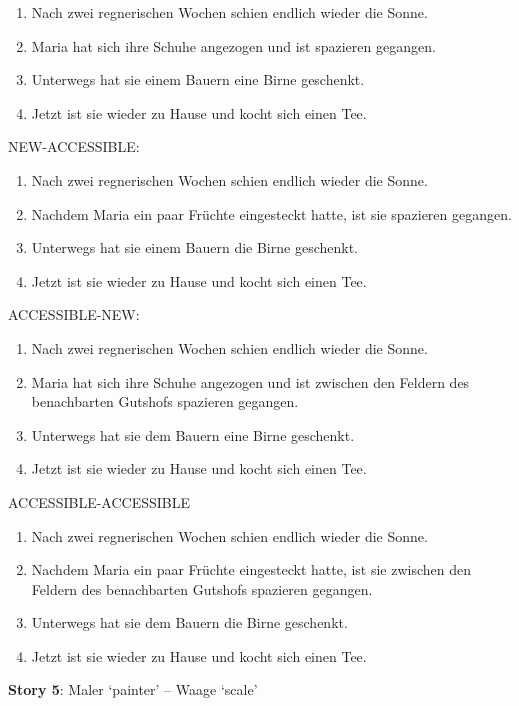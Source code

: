 \begin{enumerate}
\item Nach zwei regnerischen Wochen schien endlich wieder die Sonne.
\item Maria hat sich ihre Schuhe angezogen und ist spazieren gegangen. 
\item Unterwegs hat sie einem Bauern eine Birne geschenkt.
\item Jetzt ist sie wieder zu Hause und kocht sich einen Tee.
\end{enumerate}

NEW-ACCESSIBLE:

\begin{enumerate}
\item Nach zwei regnerischen Wochen schien endlich wieder die Sonne.
\item Nachdem Maria ein paar Früchte eingesteckt hatte, ist sie spazieren gegangen.
\item Unterwegs hat sie einem Bauern die Birne geschenkt.
\item Jetzt ist sie wieder zu Hause und kocht sich einen Tee.
\end{enumerate}

ACCESSIBLE-NEW:

\begin{enumerate}
\item Nach zwei regnerischen Wochen schien endlich wieder die Sonne.
\item Maria hat sich ihre Schuhe angezogen und ist zwischen den Feldern des benachbarten Gutshofs spazieren gegangen. 
\item Unterwegs hat sie dem Bauern eine Birne geschenkt.
\item Jetzt ist sie wieder zu Hause und kocht sich einen Tee.
\end{enumerate}

ACCESSIBLE-ACCESSIBLE

\begin{enumerate}
\item Nach zwei regnerischen Wochen schien endlich wieder die Sonne.
\item Nachdem Maria ein paar Früchte eingesteckt hatte, ist sie zwischen den Feldern des benachbarten Gutshofs spazieren gegangen.
\item Unterwegs hat sie dem Bauern die Birne geschenkt.
\item Jetzt ist sie wieder zu Hause und kocht sich einen Tee.
\end{enumerate}

\textbf{Story 5}: Maler `painter' – Waage `scale'\\

